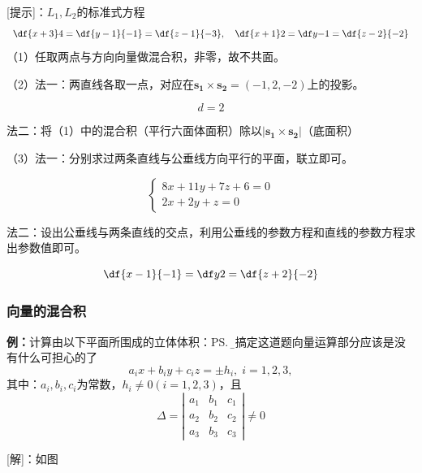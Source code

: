 [提示]：$L_1,L_2$的标准式方程
$$\df{x+3}4=\df{y-1}{-1}=\df{z-1}{-3},\quad
\df{x+1}2=\df y{-1}=\df{z-2}{-2}$$
（1）任取两点与方向向量做混合积，非零，故不共面。

（2）法一：两直线各取一点，对应在$\bm{s_1}\times\bm{s_2}=(-1,2,-2)$上的投影。

$$d=2$$

法二：将（1）中的混合积（平行六面体面积）除以$|\bm{s_1}\times\bm{s_2}|$（底面积）

（3）法一：分别求过两条直线与公垂线方向平行的平面，联立即可。

$$\left\{\begin{array}{l}
	8x+11y+7z+6=0\\
	2x+2y+z=0
\end{array}\right.$$

法二：设出公垂线与两条直线的交点，利用公垂线的参数方程和直线的参数方程求出参数值即可。

$$\df{x-1}{-1}=\df y2=\df{z+2}{-2}$$

\subsubsection{向量的混合积}

{\bf 例：}计算由以下平面所围成的立体体积：\ps{\b 能搞定这道题向量运算部分应该是没有什么可担心的了}
$$a_ix+b_iy+c_iz=\pm h_i,\;i=1,2,3,$$
其中：$a_i,b_i,c_i$为常数，$h_i\ne0(i=1,2,3)$，且
$$\Delta=\left|\begin{array}{ccc}
a_1 & b_1 & c_1\\ a_2 & b_2 & c_2 \\ a_3 & b_3 & c_3
\end{array}\right|\ne 0$$

[解]：如图

\begin{center}
\end{center}

